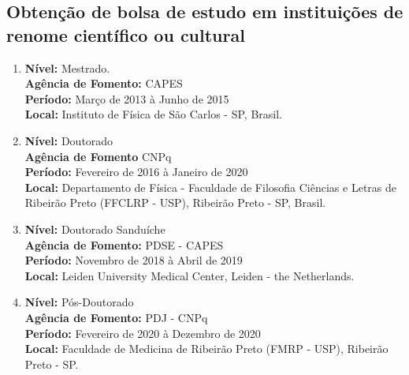 \documentclass[a4paper,oneside,10pt]{article}
\begin{document}

\subsection{\large{Obtenção  de  bolsa  de  estudo  em  instituições de  renome  científico  ou  cultural}}
\vspace{0.3cm}

\begin{enumerate}
\renewcommand{\labelenumi}{{\large\bfseries\arabic{enumi}.}}

\item   \textbf{Nível:} Mestrado. \mbox{} \\
        \textbf{Agência de Fomento:} CAPES\\
        \textbf{Período:} Março de 2013 à Junho de 2015\\
        \textbf{Local:} Instituto de Física de São Carlos - SP, Brasil.

\item   \textbf{Nível:} Doutorado \mbox{} \\
        \textbf{Agência de Fomento} CNPq \\
        \textbf{Período:} Fevereiro de 2016 à Janeiro de 2020\\
        \textbf{Local:} Departamento de Física - Faculdade de Filosofia Ciências e Letras de Ribeirão Preto (FFCLRP - USP), Ribeirão Preto - SP, Brasil.

\item   \textbf{Nível:} Doutorado Sanduíche \mbox{} \\
        \textbf{Agência de Fomento:} PDSE - CAPES\\
        \textbf{Período:} Novembro de 2018 à Abril de 2019\\
        \textbf{Local:} Leiden University Medical Center, Leiden - the Netherlands. 

\item   \textbf{Nível:} Pós-Doutorado \mbox{} \\
        \textbf{Agência de Fomento:} PDJ - CNPq\\
        \textbf{Período:} Fevereiro de 2020 à Dezembro de 2020\\
        \textbf{Local:} Faculdade de Medicina de Ribeirão Preto (FMRP - USP), Ribeirão Preto - SP.

\end{enumerate}
\end{document}
